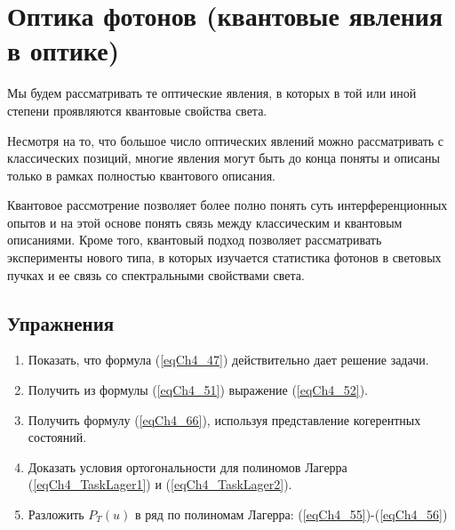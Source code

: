 \chapter{Оптика фотонов (квантовые явления в оптике)}
Мы будем рассматривать те оптические явления, в которых в той или иной
степени проявляются квантовые свойства света. 

Несмотря на то, что большое число оптических явлений можно
рассматривать с классических позиций, многие явления могут быть до
конца поняты и описаны только в рамках полностью квантового описания. 

Квантовое рассмотрение позволяет более полно понять суть
интерференционных опытов и на этой основе понять связь между
классическим и квантовым описаниями. Кроме того, квантовый подход
позволяет рассматривать эксперименты нового типа, в которых изучается
статистика фотонов в световых пучках и ее связь со спектральными
свойствами света.  












\section{Упражнения}
\begin{enumerate}
\item Показать, что формула (\ref{eqCh4_47}) действительно дает
  решение задачи. 
\item Получить из формулы (\ref{eqCh4_51}) выражение (\ref{eqCh4_52}).
\item Получить формулу (\ref{eqCh4_66}), используя представление
  когерентных состояний.  
\item Доказать условия ортогональности для полиномов Лагерра
  (\ref{eqCh4_TaskLager1}) и (\ref{eqCh4_TaskLager2}).
\item Разложить $P_T\left(u\right)$ в ряд по полиномам Лагерра:
  (\ref{eqCh4_55})-(\ref{eqCh4_56})
\end{enumerate}


